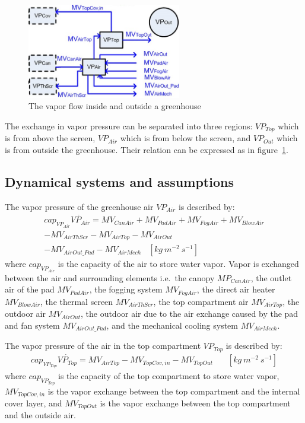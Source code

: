 \documentclass[a4paper]{article}
\numberwithin{equation}{section}
\begin{document}
\begin{figure}[H]
  \centering
  \includegraphics[width=0.6\textwidth]{VP}
  \caption{The vapor flow inside and outside a greenhouse}\label{fig:VP}
\end{figure}

The exchange in vapor pressure can be separated into three regions: \(VP_{Top}\) which is from above the screen, \(VP_{Air}\) which is from below the screen, and \(VP_{Out}\) which is from outside the greenhouse.
Their relation can be expressed as in figure~\ref{fig:VP}.

\subsection{Dynamical systems and assumptions}
The vapor pressure of the greenhouse air \(VP_{Air}\) is described by:
\begin{multline*}
  cap_{VP_{Air}}\dot{VP_{Air}} = MV_{CanAir} + MV_{PadAir} + MV_{FogAir} + MV_{BlowAir} \\
  - MV_{AirThScr} - MV_{AirTop} - MV_{AirOut} \\
  - MV_{AirOut\_Pad} - MV_{AirMech} ~~~~ [kg\ m^{-2}\ s^{-1}]
\end{multline*}
where \(cap_{VP_{Air}}\) is the capacity of the air to store water vapor.
Vapor is exchanged between the air and surrounding elements i.e.\ the canopy \(MP_{CanAir}\), the outlet air of the pad \(MV_{PadAir}\), the fogging system \(MV_{FogAir}\), the direct air heater \(MV_{BlowAir}\), the thermal screen \(MV_{AirThScr}\), the top compartment air \(MV_{AirTop}\), the outdoor air \(MV_{AirOut}\), the outdoor air due to the air exchange caused by the pad and fan system \(MV_{AirOut\_Pad}\), and the mechanical cooling system \(MV_{AirMech}\).

The vapor pressure of the air in the top compartment \(VP_{Top}\) is described by:
\begin{multline*}
  cap_{VP_{Top}}\dot{VP_{Top}} = MV_{AirTop} - MV_{TopCov,in} - MV_{TopOut} ~~~~~~~~ [kg\ m^{-2}\ s^{-1}]
\end{multline*}
where \(cap_{VP_{Top}}\) is the capacity of the top compartment to store water vapor, \(MV_{TopCov,in}\) is the vapor exchange between the top compartment and the internal cover layer, and \(MV_{TopOut}\) is the vapor exchange between the top compartment and the outside air.
\end{document}
